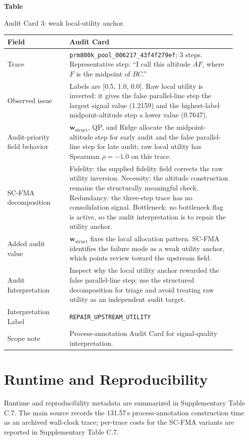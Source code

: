 \documentclass[pdflatex,sn-mathphys-num]{sn-jnl}
\newcommand{\wstruct}{\ensuremath{\mathbf{w}_{\mathrm{struct}}}}
\begin{document}
\par\medskip
{}\label{tab:audit-card-utility}
\noindent\textbf{Table~\thetable}\par
\noindent Audit Card 3: weak local-utility anchor.
\begin{center}
\small
\renewcommand{\arraystretch}{1.08}
\begin{tabular}{p{0.25\linewidth}p{0.67\linewidth}}
\toprule
\textbf{Field} & \textbf{Audit Card} \\
\midrule
Trace & \texttt{prm800k\_pool\_006217\_43f4f279ef}; 3 steps. Representative step: ``I call this altitude $\overline{AF}$, where $F$ is the midpoint of $BC$.'' \\
Observed issue & Labels are [0.5, 1.0, 0.0]. Raw local utility is inverted: it gives the false parallel-line step the largest signal value (1.2159) and the highest-label midpoint-altitude step a lower value (0.7647). \\
Audit-priority field behavior & \wstruct{}, QP, and Ridge allocate the midpoint-altitude step for early audit and the false parallel-line step for late audit; raw local utility has Spearman $\rho=-1.0$ on this trace. \\
SC-FMA decomposition & Fidelity: the supplied fidelity field corrects the raw utility inversion. Necessity: the altitude construction remains the structurally meaningful check. Redundancy: the three-step trace has no consolidation signal. Bottleneck: no bottleneck flag is active, so the audit interpretation is to repair the utility anchor. \\
Added audit value & \wstruct{} fixes the local allocation pattern. SC-FMA identifies the failure mode as a weak utility anchor, which points review toward the upstream field. \\
Audit Interpretation & Inspect why the local utility anchor rewarded the false parallel-line step; use the structured decomposition for triage and avoid treating raw utility as an independent audit target. \\
Interpretation Label & \texttt{REPAIR\_UPSTREAM\_UTILITY} \\
Scope note & Process-annotation Audit Card for signal-quality interpretation. \\
\bottomrule
\end{tabular}
\end{center}
\medskip

\section{Runtime and Reproducibility}
\label{app:runtime-reproducibility}

Runtime and reproducibility metadata are summarized in Supplementary Table C.7. The main source records the 131.57\,s process-annotation construction time as an archived wall-clock trace; per-trace costs for the SC-FMA variants are reported in Supplementary Table C.7.


\clearpage



\end{document}
